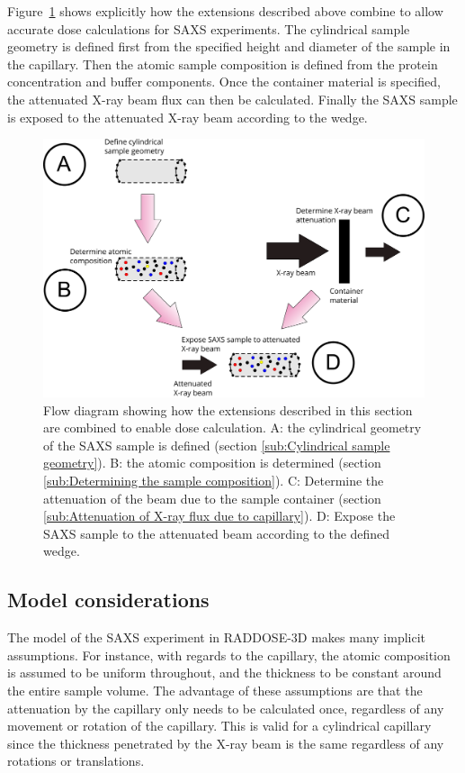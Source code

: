 Figure~\ref{fig:SAXS Flow diagram} shows explicitly how the extensions described above combine to allow accurate dose calculations for SAXS experiments.
The cylindrical sample geometry is defined first from the specified height and diameter of the sample in the capillary.
Then the atomic sample composition is defined from the protein concentration and buffer components.
Once the container material is specified, the attenuated X-ray beam flux can then be calculated.
Finally the SAXS sample is exposed to the attenuated X-ray beam according to the wedge.
\begin{figure}
    \centering
    \includegraphics[width=1\textwidth]{figures/saxs/SAXS_flowchart.pdf}
    \caption{Flow diagram showing how the extensions described in this section are combined to enable dose calculation.
    A: the cylindrical geometry of the SAXS sample is defined (section \ref{sub:Cylindrical sample geometry}).
    B: the atomic composition is determined (section \ref{sub:Determining the sample composition}).
    C: Determine the attenuation of the beam due to the sample container (section \ref{sub:Attenuation of X-ray flux due to capillary}).
    D: Expose the SAXS sample to the attenuated beam according to the defined wedge.}
    \label{fig:SAXS Flow diagram}
\end{figure}

\subsection{Model considerations}
\label{sub:Model considerations}
The model of the SAXS experiment in RADDOSE-3D makes many implicit assumptions.
For instance, with regards to the capillary, the atomic composition is assumed to be uniform throughout, and the thickness to be constant around the entire sample volume.
The advantage of these assumptions are that the attenuation by the capillary only needs to be calculated once, regardless of any movement or rotation of the capillary.
This is valid for a cylindrical capillary since the thickness penetrated by the X-ray beam is the same regardless of any rotations or translations.

